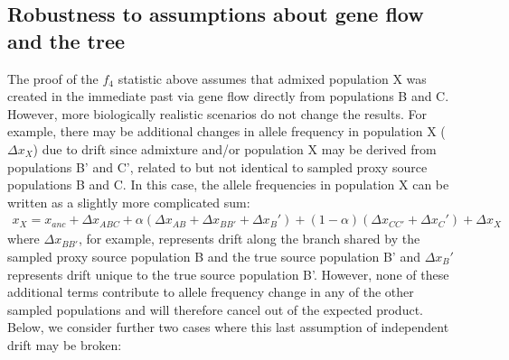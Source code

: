\documentclass[12pt]{report}
\begin{document}
\subsection{Robustness to assumptions about gene flow and the tree}
The proof of the $f_4$ statistic above assumes that admixed population X was created in the immediate past via gene flow directly from populations B and C. However, more biologically realistic scenarios do not change the results. For example, there may be additional changes in allele frequency in population X ($\Delta{x_X}$) due to drift since admixture and/or population X may be derived from populations B' and C', related to but not identical to sampled proxy source populations B and C. In this case, the allele frequencies in population X can be written as a slightly more complicated sum: 
\begin{align*}
x_X = x_{anc} + \Delta{x_{ABC}} + \alpha(\Delta{x_{AB}} + \Delta{x_{BB'}} + \Delta{x_B'}) + (1 - \alpha)(\Delta{x_{CC'}} + \Delta{x_C'}) + \Delta{x_X}
\end{align*}
where $\Delta{x_{BB'}}$, for example, represents drift along the branch shared by the sampled proxy source population B and the true source population B' and $\Delta{x_B'}$ represents drift unique to the true source population B'.
However, none of these additional terms contribute to allele frequency change in any of the other sampled populations and will therefore cancel out of the expected product. Below, we consider further two cases where this last assumption of independent drift may be broken: 
\end{document}
